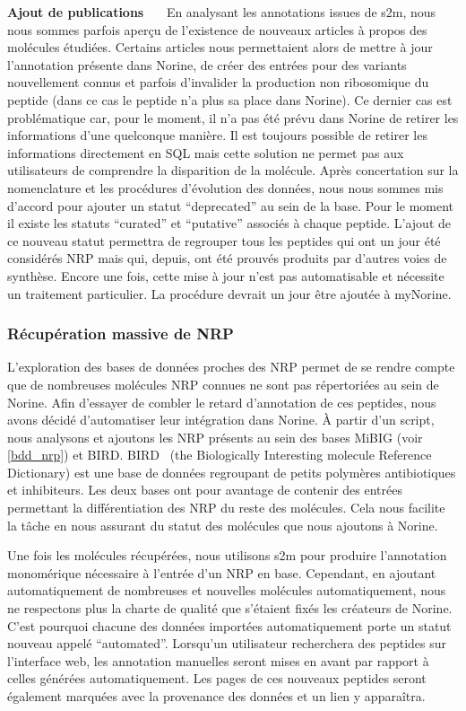 \textbf{Ajout de publications}~~~
En analysant les annotations issues de s2m, nous nous sommes parfois aperçu de l'existence de nouveaux articles à propos des molécules étudiées.
Certains articles nous permettaient alors de mettre à jour l'annotation présente dans Norine, de créer des entrées pour des variants nouvellement connus et parfois d'invalider la production non ribosomique du peptide (dans ce cas le peptide n'a plus sa place dans Norine).
Ce dernier cas est problématique car, pour le moment, il n'a pas été prévu dans Norine de retirer les informations d'une quelconque manière.
Il est toujours possible de retirer les informations directement en SQL mais cette solution ne permet pas aux utilisateurs de comprendre la disparition de la molécule.
Après concertation sur la nomenclature et les procédures d'évolution des données, nous nous sommes mis d'accord pour ajouter un statut ``deprecated'' au sein de la base.
Pour le moment il existe les statuts ``curated'' et ``putative'' associés à chaque peptide.
L'ajout de ce nouveau statut permettra de regrouper tous les peptides qui ont un jour été considérés NRP mais qui, depuis, ont été prouvés produits par d'autres voies de synthèse.
Encore une fois, cette mise à jour n'est pas automatisable et nécessite un traitement particulier.
La procédure devrait un jour être ajoutée à myNorine.


\subsubsection{Récupération massive de NRP}
\label{nor_fill}

L'exploration des bases de données proches des NRP permet de se rendre compte que de nombreuses molécules NRP connues ne sont pas répertoriées au sein de Norine.
Afin d'essayer de combler le retard d'annotation de ces peptides, nous avons décidé d'automatiser leur intégration dans Norine.
À partir d'un script, nous analysons et ajoutons les NRP présents au sein des bases MiBIG (voir \ref{bdd_nrp}) et BIRD.
BIRD~\cite{young_chemical_2013} (the Biologically Interesting molecule Reference Dictionary) est une base de données regroupant de petits polymères antibiotiques et inhibiteurs.
Les deux bases ont pour avantage de contenir des entrées permettant la différentiation des NRP du reste des molécules.
Cela nous facilite la tâche en nous assurant du statut des molécules que nous ajoutons à Norine.

Une fois les molécules récupérées, nous utilisons s2m pour produire l'annotation monomérique nécessaire à l'entrée d'un NRP en base.
Cependant, en ajoutant automatiquement de nombreuses et nouvelles molécules automatiquement, nous ne respectons plus la charte de qualité que s'étaient fixés les créateurs de Norine.
C'est pourquoi chacune des données importées automatiquement porte un statut nouveau appelé ``automated''.
Lorsqu'un utilisateur recherchera des peptides sur l'interface web, les annotation manuelles seront mises en avant par rapport à celles générées automatiquement.
Les pages de ces nouveaux peptides seront également marquées avec la provenance des données et un lien y apparaîtra.

